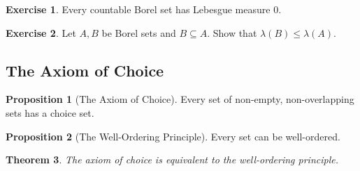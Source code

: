 \documentclass[12pt]{article}
\newtheorem{theo}{Theorem}[section]
\theoremstyle{definition}
\newtheorem{prop}[theo]{Proposition}
\newtheorem{exer}{Exercise}
\begin{document}
\begin{exer}
Every countable Borel set has Lebesgue measure $0$.
\end{exer}

\begin{exer}
Let $A, B$ be Borel sets and $B\subseteq A$. Show that $\lambda(B) \leqslant \lambda(A)$.
\end{exer}

\subsection{The Axiom of Choice}

\begin{prop} 
[The Axiom of Choice] Every set of non-empty, non-overlapping sets has a choice set.
\end{prop}

\begin{prop}
[The Well-Ordering Principle] Every set can be well-ordered.
\end{prop}

\begin{theo}
The axiom of choice is equivalent to the well-ordering principle.
\end{theo}
\end{document}
